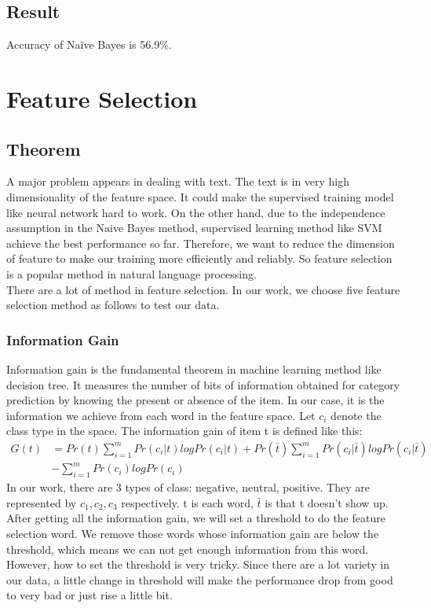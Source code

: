 \documentclass{article}
\begin{document}
    \subsection{Result} 
      Accuracy of Na\"ive Bayes is 56.9\%.
  \section{Feature Selection}
  \subsection{Theorem}
  A major problem appears in dealing with text. The text is in very high dimensionality of the feature space. It could make the supervised training model like neural network hard to work. On the other hand, due to the independence assumption in the Naive Bayes method, supervised learning method like SVM achieve the best performance so far. Therefore, we want to reduce the dimension of feature to make our training more efficiently and reliably. So feature selection is a popular method in natural language processing.\\
  There are a lot of method in feature selection. In our work, we choose five feature selection method as follows to test our data.
  \subsubsection{Information Gain}
  Information gain is the fundamental theorem in machine learning method like decision tree. It measures the number of bits of information obtained for category prediction by knowing the present or absence of the item. In our case, it is the information we achieve from each word in the feature space. Let $c_i$ denote the class type in the space. The information gain of item t is defined like this:
  \begin{equation}
  \begin{split}
  G(t)&=Pr(t)\sum_{i=1}^{m}Pr(c_i|t)logPr(c_i|t)+Pr(\bar{t})\sum_{i=1}^{m}Pr(c_i|\bar{t})logPr(c_i|\bar{t})\\
  &-\sum_{i=1}^{m}Pr(c_i)logPr(c_i)
  \end{split}
  \end{equation}
  In our work, there are 3 types of class: negative, neutral, positive. They are represented by $c_1,c_2,c_3$ respectively. t is each word, $\bar{t}$ is that t doesn't show up. After getting all the information gain, we will set a threshold to do the feature selection word. We remove those words whose information gain are below the threshold, which means we can not get enough information from this word. However, how to set the threshold is very tricky. Since there are a lot variety in our data, a little change in threshold will make the performance drop from good to very bad or just rise a little bit.
\end{document}
